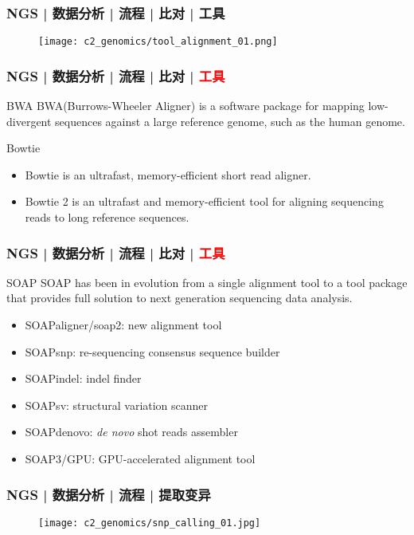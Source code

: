 \begin{frame}
  \frametitle{NGS | 数据分析 | 流程 | 比对 | 工具}
  \begin{figure}
    \centering
    \texttt{[image: c2\_genomics/tool\_alignment\_01.png]}
  \end{figure}
\end{frame}

\begin{frame}
  \frametitle{NGS | 数据分析 | 流程 | 比对 | \textcolor{red}{工具}}
  \begin{block}{BWA}
    BWA(Burrows-Wheeler Aligner) is a software package for mapping low-divergent sequences against a large reference genome, such as the human genome.
  \end{block}
  \pause
  \begin{block}{Bowtie}
    \begin{itemize}
      \item Bowtie is an ultrafast, memory-efficient short read aligner.
      \item Bowtie 2 is an ultrafast and memory-efficient tool for aligning sequencing reads to long reference sequences.
    \end{itemize}
  \end{block}
\end{frame}

\begin{frame}
  \frametitle{NGS | 数据分析 | 流程 | 比对 | \textcolor{red}{工具}}
  \begin{block}{SOAP}
    SOAP has been in evolution from a single alignment tool to a tool package that provides full solution to next generation sequencing data analysis.
    \begin{itemize}
      \item SOAPaligner/soap2: new alignment tool
      \item SOAPsnp: re-sequencing consensus sequence builder
      \item SOAPindel: indel finder
      \item SOAPsv: structural variation scanner
      \item SOAPdenovo: \textit{de novo} shot reads assembler
      \item SOAP3/GPU: GPU-accelerated alignment tool
    \end{itemize}
  \end{block}
\end{frame}

\begin{frame}
  \frametitle{NGS | 数据分析 | 流程 | 提取变异}
  \begin{figure}
    \centering
    \texttt{[image: c2\_genomics/snp\_calling\_01.jpg]}
  \end{figure}
\end{frame}

